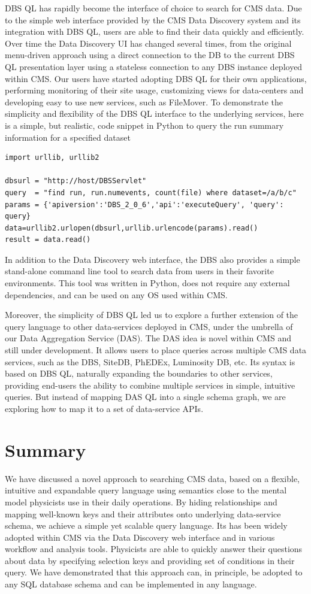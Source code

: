 \documentclass[a4paper]{jpconf}
\begin{document}
DBS QL has rapidly become the interface of choice to search for
CMS data. Due to the simple web interface provided by the CMS
Data Discovery\cite{DD} system and its integration with DBS QL,
users are able to find their data quickly and
efficiently. Over time the Data Discovery UI has
changed several times, from the original menu-driven approach using
a direct connection to the DB to the current DBS QL presentation layer
using a stateless connection to any DBS instance deployed
within CMS. Our users have started adopting DBS QL for their
own applications, performing monitoring of their
site usage, customizing views for data-centers
and developing easy to use new services, such as
FileMover\cite{FileMover}. To demonstrate the simplicity and
flexibility of the DBS QL interface to the underlying services,
here is a simple, but realistic,
code snippet in Python to query the run summary information
for a specified dataset
\begin{verbatim}
import urllib, urllib2

dbsurl = "http://host/DBSServlet"
query  = "find run, run.numevents, count(file) where dataset=/a/b/c"
params = {'apiversion':'DBS_2_0_6','api':'executeQuery', 'query': query} 
data=urllib2.urlopen(dbsurl,urllib.urlencode(params).read()
result = data.read()
\end{verbatim}
In addition to the Data Discovery web interface, the DBS also
provides a simple stand-alone command line tool
to search data from users in their
favorite environments. This tool was written
in Python, does not require any external dependencies, and can
be used on any OS used within CMS.

Moreover, the simplicity of DBS QL led us to explore a further
extension of the query language to other data-services deployed in CMS, under
the umbrella of our Data Aggregation Service (DAS). The DAS idea is
novel within CMS and still under development.
It allows users to place queries across multiple CMS data services,
such as the DBS, SiteDB, PhEDEx, Luminosity DB, etc.  Its syntax
is based on DBS QL, naturally
expanding the boundaries to other services, providing
end-users the ability to combine multiple services in simple, intuitive
queries. But instead of mapping DAS QL into a single
schema graph, we are exploring how to map it to a set of data-service APIs.

\section{Summary}
We have discussed a novel approach to searching CMS data,
based on a flexible,
intuitive and expandable query language using
semantics close to the mental model physicists use in their 
daily operations.
By hiding relationships and mapping well-known
keys and their attributes onto underlying data-service
schema, we achieve a simple yet scalable query language. Its 
has been widely adopted within CMS via the Data Discovery web interface and
in various workflow and analysis tools. Physicists
are able to quickly answer their questions about data by
specifying selection keys and providing set of conditions
in their query. We have demonstrated that this approach
can, in principle, be adopted to any SQL database schema and can be implemented
in any language.
\end{document}
